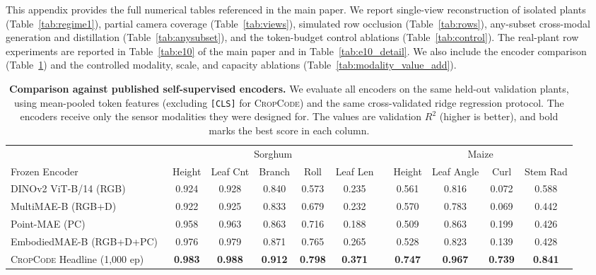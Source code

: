 \documentclass[10pt,twocolumn,letterpaper]{article}
\newcommand{\method}{\textsc{CropCode}}
\providecommand{\CropCode}{\textsc{CropCode}}
\begin{document}
This appendix provides the full numerical tables referenced in the main paper. We report single-view reconstruction of isolated plants (Table~\ref{tab:regime1}), partial camera coverage (Table~\ref{tab:views}), simulated row occlusion (Table~\ref{tab:rows}), any-subset cross-modal generation and distillation (Table~\ref{tab:anysubset}), and the token-budget control ablations (Table~\ref{tab:control}). The real-plant row experiments are reported in Table~\ref{tab:e10} of the main paper and in Table~\ref{tab:e10_detail}. We also include the encoder comparison (Table~\ref{tab:baselines}) and the controlled modality, scale, and capacity ablations (Table~\ref{tab:modality_value_add}).

\begin{table}[t]
  \caption{\textbf{Comparison against published self-supervised encoders.} We evaluate all encoders on the same held-out validation plants, using mean-pooled token features (excluding \texttt{[CLS]} for \method{}) and the same cross-validated ridge regression protocol. The encoders receive only the sensor modalities they were designed for. The values are validation $R^2$ (higher is better), and bold marks the best score in each column.}
  \label{tab:e8}\label{tab:baselines}
  \centering\scriptsize
  \setlength{\tabcolsep}{2.6pt}
  \begin{tabular}{l ccc cc c cccc}
    \toprule
    & \multicolumn{5}{c}{Sorghum} & & \multicolumn{4}{c}{Maize} \\
    \cmidrule(lr){2-6}\cmidrule(lr){8-11}
    Frozen Encoder & Height & Leaf Cnt & Branch & Roll & Leaf Len & & Height & Leaf Angle & Curl & Stem Rad \\
    \midrule
    DINOv2 ViT-B/14 (RGB)~\cite{oquab2024dinov2} & 0.924 & 0.928 & 0.840 & 0.573 & 0.235 & & 0.561 & 0.816 & 0.072 & 0.588 \\
    MultiMAE-B (RGB+D)~\cite{bachmann2022multimae} & 0.922 & 0.925 & 0.833 & 0.679 & 0.232 & & 0.570 & 0.783 & 0.069 & 0.442 \\
    Point-MAE (PC)~\cite{pang2022pointmae} & 0.958 & 0.963 & 0.863 & 0.716 & 0.188 & & 0.509 & 0.863 & 0.199 & 0.426 \\
    EmbodiedMAE-B (RGB+D+PC)~\cite{dong2025embodiedmae} & 0.976 & 0.979 & 0.871 & 0.765 & 0.265 & & 0.528 & 0.823 & 0.139 & 0.428 \\
    \CropCode{} Headline (1{,}000 ep) & \textbf{0.983} & \textbf{0.988} & \textbf{0.912} & \textbf{0.798} & \textbf{0.371} & & \textbf{0.747} & \textbf{0.967} & \textbf{0.739} & \textbf{0.841} \\
    \bottomrule
  \end{tabular}
\end{table}
\end{document}

